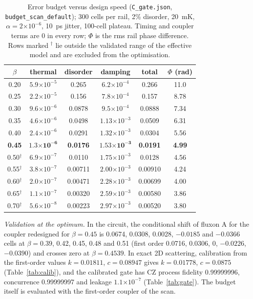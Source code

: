 \documentclass[10pt,twocolumn,letterpaper]{article}
\newcommand{\ee}[1]{\ensuremath{\times10^{#1}}}
\newcommand{\file}[1]{\texttt{#1}}
\begin{document}
\begin{table}[t]
\centering\footnotesize
\caption{Error budget versus design speed (\file{C\_\allowbreak{}gate.\allowbreak{}json}, \file{budget\_\allowbreak{}scan\_\allowbreak{}default}); 300 cells per rail,
2\% disorder, 20~mK, $\alpha=2\ee{-6}$, 10~ps jitter, 100-cell plateau. Timing and coupler terms are 0 in every row;
$\Phi$ is the rms rail phase difference. Rows marked $^\dagger$ lie outside the validated range of the effective model
and are excluded from the optimisation.}
\label{tab:budget}
\setlength{\tabcolsep}{2.5pt}
\begin{tabular}{@{}cccccc@{}}
\toprule
$\beta$ & thermal & disorder & damping & total & $\Phi$ (rad)\\
\midrule
0.20 & $5.9\ee{-5}$ & 0.265 & $6.2\ee{-4}$ & 0.266 & 11.0\\
0.25 & $2.2\ee{-5}$ & 0.156 & $7.8\ee{-4}$ & 0.157 & 8.78\\
0.30 & $9.6\ee{-6}$ & 0.0878 & $9.5\ee{-4}$ & 0.0888 & 7.34\\
0.35 & $4.6\ee{-6}$ & 0.0498 & $1.13\ee{-3}$ & 0.0509 & 6.31\\
0.40 & $2.4\ee{-6}$ & 0.0291 & $1.32\ee{-3}$ & 0.0304 & 5.56\\
\textbf{0.45} & $\mathbf{1.3\ee{-6}}$ & \textbf{0.0176} & $\mathbf{1.53\ee{-3}}$ & \textbf{0.0191} & \textbf{4.99}\\
0.50$^\dagger$ & $6.9\ee{-7}$ & 0.0110 & $1.75\ee{-3}$ & 0.0128 & 4.56\\
0.55$^\dagger$ & $3.8\ee{-7}$ & 0.00711 & $2.00\ee{-3}$ & 0.00910 & 4.24\\
0.60$^\dagger$ & $2.0\ee{-7}$ & 0.00471 & $2.28\ee{-3}$ & 0.00699 & 4.00\\
0.65$^\dagger$ & $1.1\ee{-7}$ & 0.00320 & $2.59\ee{-3}$ & 0.00580 & 3.86\\
0.70$^\dagger$ & $5.6\ee{-8}$ & 0.00223 & $2.97\ee{-3}$ & 0.00520 & 3.80\\
\bottomrule
\end{tabular}
\end{table}

\emph{Validation at the optimum.} In the circuit, the conditional shift of fluxon A for the coupler redesigned for
$\beta=0.45$ is 0.0674, 0.0308, 0.0028, $-0.0185$ and $-0.0366$ cells at $\beta=0.39$, 0.42, 0.45, 0.48 and 0.51
(first order 0.0716, 0.0306, 0, $-0.0226$, $-0.0390$) and crosses zero at $\beta=0.4539$. In exact 2D scattering,
calibration from the first-order values $k=0.01811$, $c=0.08947$ gives $k=0.01778$, $c=0.0875$ (Table~\ref{tab:calib}),
and the calibrated gate has CZ process fidelity 0.99999996, concurrence 0.99999997 and leakage $1.1\ee{-7}$
(Table~\ref{tab:gate}). The budget itself is evaluated with the first-order coupler of the scan.
\end{document}
